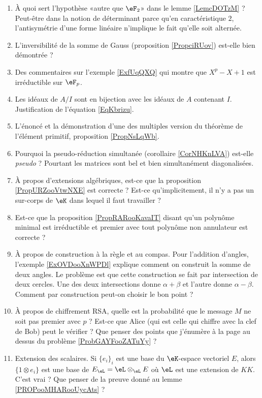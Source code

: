 \begin{enumerate}
    \item
        À quoi sert l'hypothèse «autre que \( \eF_2\)» dans le lemme \ref{LemcDOTzM} ? Peut-être dans la notion de déterminant parce qu'en caractéristique \( 2\), l'antisymétrie d'une forme linéaire n'implique le fait qu'elle soit alternée.
    \item
        L'inversibilité de la somme de Gauss (proposition \ref{PropciRUov}) est-elle bien démontrée ?
    \item
        Des commentaires sur l'exemple \ref{ExfUqQXQ} qui montre que \( X^p-X+1\) est irréductible sur \( \eF_p\).
    \item
        Les idéaux de \( A/I\) sont en bijection avec les idéaux de \( A\) contenant \( I\). Justification de l'équation \eqref{EqKbrizu}.
    \item
        L'énoncé et la démonstration d'une des multiples version du théorème de l'élément primitif, proposition \ref{PropNsLqWb}.
    \item
        Pourquoi la pseudo-réduction simultanée (corollaire \ref{CorNHKnLVA}) est-elle \emph{pseudo} ? Pourtant les matrices sont bel et bien simultanément diagonalisées.
    \item
        À propos d'extensions algébriques, est-ce que la proposition \ref{PropURZooVtwNXE} est correcte ? Est-ce qu'implicitement, il n'y a pas un sur-corps de \( \eK\) dans lequel il faut travailler ?
    \item
        Est-ce que la proposition \ref{PropRARooKavaIT} disant qu'un polynôme minimal est irréductible et premier avec tout polynôme non annulateur est correcte ?
    \item
        À propos de construction à la règle et au compas. Pour l'addition d'angles, l'exemple \ref{ExOVDooXnWPDl} explique comment on construit la somme de deux angles. Le problème est que cette construction se fait par intersection de deux cercles. Une des deux intersections donne \( \alpha+\beta\) et l'autre donne \( \alpha-\beta\). Comment par construction peut-on choisir le bon point ?
    \item
        À propos de chiffrement RSA, quelle est la probabilité que le message \( M\) ne soit pas premier avec \( p\) ? Est-ce que Alice (qui est celle qui chiffre avec la clef de Bob) peut le vérifier ? Que penser des points que j'énumère à la page \pageref{PageAKTBooMDeQxY} au dessus du problème \ref{ProbGAYFooZATuYy} ?
    \item
        Extension des scalaires. Si \( \{ e_i \}_i\) est une base du \( \eK\)-espace vectoriel \( E\), alors \( \{ 1\otimes e_i \}\) est une base de \( E_{\eL}=\eL\otimes_{\eL}E\) où \( \eL\) est une extension de \( KK\). C'est vrai ? Que penser de la preuve donné au lemme \ref{PROPooMHARooUycAts} ?

\end{enumerate}
